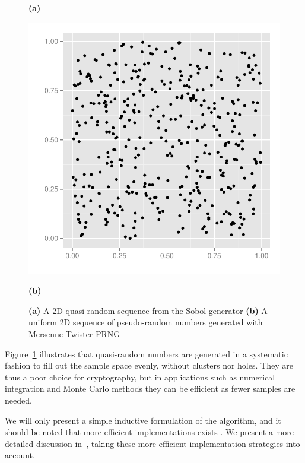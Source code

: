 \documentclass{llncs2e/llncs}
\begin{document}
\begin{figure}
\begin{minipage}{0.45\linewidth}
\begin{center}
      \hspace{0.55cm}\textbf{(a)}
    \end{center}
  \end{minipage}
  \begin{minipage}{0.45\linewidth}
    \begin{center}
      \includegraphics[width=\textwidth]{../report/graphics/2D-mersenne-sequence.pdf}

      \hspace{0.55cm}\textbf{(b)}
    \end{center}
  \end{minipage}

  \caption{\textbf{(a)} A 2D quasi-random sequence from the Sobol
    generator \textbf{(b)} A uniform 2D sequence of pseudo-random
    numbers generated with Mersenne Twister PRNG}
\label{fig:discrepancyplot}
\end{figure}
Figure~\ref{fig:discrepancyplot} illustrates that quasi-random numbers
are generated in a systematic fashion to fill out the sample space
evenly, without clusters nor holes. They are thus a poor choice for
cryptography, but in applications such as numerical integration and
Monte Carlo methods they can be efficient as fewer samples are needed.

We will only present a simple inductive formulation of the algorithm,
and it should be noted that more efficient implementations exists
\cite{bratley1988algorithm, hwy2011emerald}. We present a more
detailed discussion in~\cite{dybdalcarlsen2013thesis}, taking these
more efficient implementation strategies into account.
\end{document}
